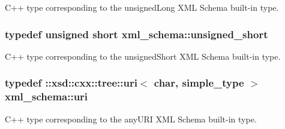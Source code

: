 C++ type corresponding to the unsigned\+Long X\+M\+L Schema built-\/in type. 

\hypertarget{namespacexml__schema_a7fc7b4a846c512c370346e15dfdcecaa}{
\subsubsection[{unsigned\+\_\+short}]{\setlength{\rightskip}{0pt plus 5cm}typedef unsigned short {\bf xml\+\_\+schema\+::unsigned\+\_\+short}}}\label{namespacexml__schema_a7fc7b4a846c512c370346e15dfdcecaa}


C++ type corresponding to the unsigned\+Short X\+M\+L Schema built-\/in type. 

\hypertarget{namespacexml__schema_a2518fddf119bd258d7443408863ee457}{
\subsubsection[{uri}]{\setlength{\rightskip}{0pt plus 5cm}typedef \+::xsd\+::cxx\+::tree\+::uri$<$ char, {\bf simple\+\_\+type} $>$ {\bf xml\+\_\+schema\+::uri}}}\label{namespacexml__schema_a2518fddf119bd258d7443408863ee457}


C++ type corresponding to the any\+U\+R\+I X\+M\+L Schema built-\/in type. 

